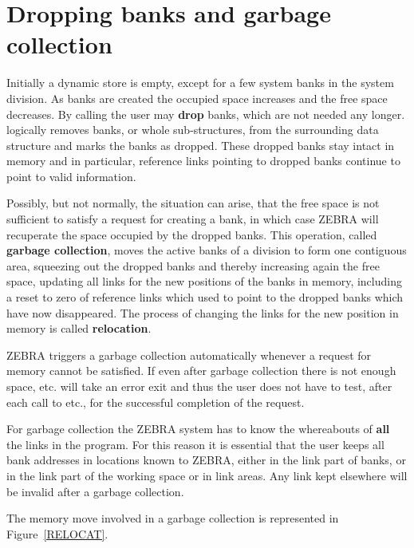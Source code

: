 \section{Dropping banks and garbage collection}

Initially a dynamic store is empty, except for a few system banks in the
system division. As banks are created the occupied space increases and
the free space decreases. 
By calling  the user may {\bf drop}
banks, which are not needed any longer. 
 logically removes banks,
or whole sub-structures, from the surrounding data structure and marks
the banks as dropped. These dropped banks stay intact in memory and in
particular, reference links pointing to dropped banks continue to point
to valid information.

Possibly, but not normally, the situation can arise, that the free space
is not sufficient to satisfy a request for creating a bank, in which case
ZEBRA will recuperate the space occupied by the dropped banks. 
This operation, called {\bf garbage collection}, moves the active
banks of
a division to form one contiguous area, squeezing out the dropped banks
and thereby increasing again the free space, updating all links for the
new positions of the banks in memory, including a reset to zero of
reference links which used to point to the dropped banks which have now
disappeared. The process of changing the links for the new position in
memory is called {\bf relocation}.

ZEBRA triggers a garbage collection automatically whenever a request
for memory cannot be satisfied. If even after garbage collection there
is not enough space,  etc. will take an error exit and thus the
user does not have to test, after each call to  etc., for the
successful completion of the request.

For garbage collection the ZEBRA system has to know the whereabouts of
{\bf all} the links in the program. 
For this reason it
is essential that the user keeps all bank addresses in locations known
to ZEBRA, either in the link part of banks, or in the link part of the
working space or in link areas. 
Any link kept elsewhere will be invalid after a garbage collection.
 
The memory move involved in a garbage collection is represented in
Figure~\ref{RELOCAT}.

